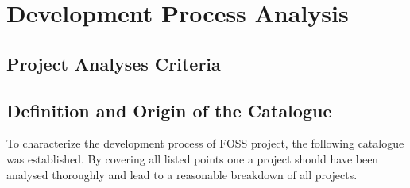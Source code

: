 \chapter{Development Process Analysis} %
\label{cha:Development Process Analysis}

\section{Project Analyses Criteria} %
\label{sec:Project Analyses Criteria}


\cleardoublepage


\cleardoublepage


\cleardoublepage


\cleardoublepage


\cleardoublepage


\cleardoublepage


\cleardoublepage
\section{Definition and Origin of the Catalogue} %
\label{sec:Definition and Origin of the Catalogue}

To characterize the development process of FOSS project, the following
catalogue was established. By covering all listed points one a project should
have been analysed thoroughly and lead to a reasonable breakdown of all
projects.

